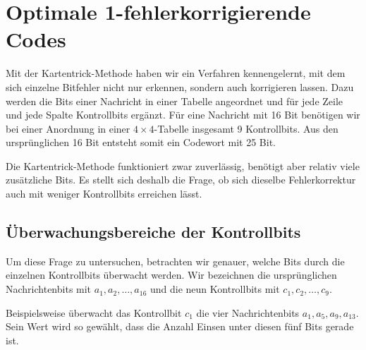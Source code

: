 \section{Optimale 1-fehlerkorrigierende Codes}




Mit der Kartentrick-Methode haben wir ein Verfahren kennengelernt,
mit dem sich einzelne Bitfehler nicht nur erkennen, sondern auch
korrigieren lassen. Dazu werden die Bits einer Nachricht in einer
Tabelle angeordnet und für jede Zeile und jede Spalte Kontrollbits
ergänzt. Für eine Nachricht mit 16 Bit benötigen wir bei einer
Anordnung in einer \(4\times 4\)-Tabelle insgesamt 9 Kontrollbits.
Aus den ursprünglichen 16 Bit entsteht somit ein Codewort mit
25 Bit.

Die Kartentrick-Methode funktioniert zwar zuverlässig, benötigt
aber relativ viele zusätzliche Bits. Es stellt sich deshalb die
Frage, ob sich dieselbe Fehlerkorrektur auch mit weniger
Kontrollbits erreichen lässt.


\subsection*{Überwachungsbereiche der Kontrollbits}

Um diese Frage zu untersuchen, betrachten wir genauer, welche Bits
durch die einzelnen Kontrollbits überwacht werden. Wir bezeichnen
die ursprünglichen Nachrichtenbits mit
\(a_1,a_2,\ldots,a_{16}\) und die neun Kontrollbits mit
\(c_1,c_2,\ldots,c_9\).

Beispielsweise überwacht das Kontrollbit \(c_1\) die vier
Nachrichtenbits \(a_1,a_5,a_9,a_{13}\). Sein Wert wird so gewählt,
dass die Anzahl Einsen unter diesen fünf Bits gerade ist.

